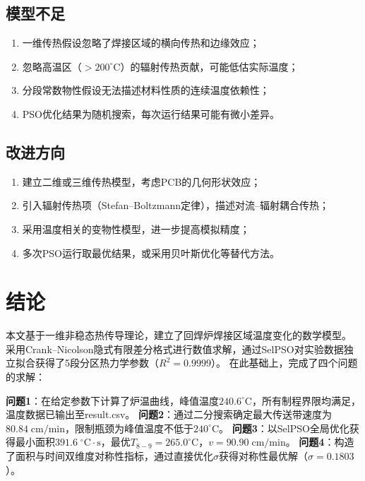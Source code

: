 \documentclass[12pt,a4paper]{ctexart}
\begin{document}
\subsection{模型不足}

\begin{enumerate}[nosep]
    \item 一维传热假设忽略了焊接区域的横向传热和边缘效应；
    \item 忽略高温区（$>$$200^{\circ}\mathrm{C}$）的辐射传热贡献，可能低估实际温度；
    \item 分段常数物性假设无法描述材料性质的连续温度依赖性；
    \item PSO优化结果为随机搜索，每次运行结果可能有微小差异。
\end{enumerate}

\subsection{改进方向}

\begin{enumerate}[nosep]
    \item 建立二维或三维传热模型，考虑PCB的几何形状效应；
    \item 引入辐射传热项（Stefan--Boltzmann定律），描述对流--辐射耦合传热；
    \item 采用温度相关的变物性模型，进一步提高模拟精度；
    \item 多次PSO运行取最优结果，或采用贝叶斯优化等替代方法。
\end{enumerate}

\section{结论}

本文基于一维非稳态热传导理论，建立了回焊炉焊接区域温度变化的数学模型。
采用Crank--Nicolson隐式有限差分格式进行数值求解，通过SelPSO对实验数据独立拟合获得了5段分区热力学参数（$R^2=0.9999$）。
在此基础上，完成了四个问题的求解：

\textbf{问题1}：在给定参数下计算了炉温曲线，峰值温度$240.6^{\circ}\mathrm{C}$，所有制程界限均满足，温度数据已输出至result.csv。
\textbf{问题2}：通过二分搜索确定最大传送带速度为$80.84\;\mathrm{cm/min}$，限制瓶颈为峰值温度不低于$240^{\circ}\mathrm{C}$。
\textbf{问题3}：以SelPSO全局优化获得最小面积$391.6\;^{\circ}\mathrm{C}\!\cdot\!\mathrm{s}$，最优$T_{8-9}=265.0^{\circ}\mathrm{C}$，$v=90.90\;\mathrm{cm/min}$。
\textbf{问题4}：构造了面积与时间双维度对称性指标，通过直接优化$\sigma$获得对称性最优解（$\sigma=0.1803$）。
\end{document}
